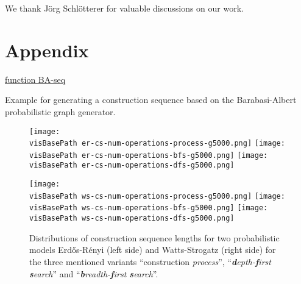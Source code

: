 \documentclass{article}
\newcommand{\visBasePath}[0]{vis/}
\begin{document}
 
\begin{ack}
We thank Jörg Schlötterer for valuable discussions on our work.
 \end{ack}






\newpage
\section*{Appendix}
\begin{algorithm}

\underline{function BA-seq} \;
\BlankLine
\;

\;
\;
\;
\KwRet{}
\caption{Example for generating a construction sequence based on the Barabasi-Albert probabilistic graph generator.}
\label{algo:barabasi-albert-conseq}
\end{algorithm}

\begin{figure*}
  \begin{minipage}[c]{0.48\linewidth}
    \texttt{[image: \\visBasePath er-cs-num-operations-process-g5000.png]}
    \texttt{[image: \\visBasePath er-cs-num-operations-bfs-g5000.png]}
    \texttt{[image: \\visBasePath er-cs-num-operations-dfs-g5000.png]}
  \end{minipage}\hfill
  \begin{minipage}[c]{0.48\linewidth}
    \texttt{[image: \\visBasePath ws-cs-num-operations-process-g5000.png]}
    \texttt{[image: \\visBasePath ws-cs-num-operations-bfs-g5000.png]}
    \texttt{[image: \\visBasePath ws-cs-num-operations-dfs-g5000.png]}
  \end{minipage}
  \caption{
    Distributions of construction sequence lengths for two probabilistic models Erdős-Rényi (left side) and Watts-Strogatz (right side) for the three mentioned variants ``construction \textit{process}'', ``\textit{\textbf{d}epth-\textbf{f}irst \textbf{s}earch}'' and ``\textit{\textbf{b}readth-\textbf{f}irst \textbf{s}earch}''.
  } \label{fig:num-operations}
\end{figure*}
 
\end{document}
